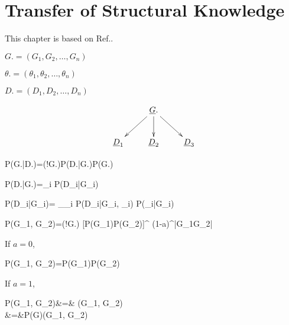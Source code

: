 \chapter{Transfer of Structural Knowledge}
\label{ch-transfer-struc}

This chapter is based on Ref.\cite{nic-transfer}.

$G. = (G_1, G_2, \ldots, G_n)$

$\theta. = (\theta_1, \theta_2, \ldots, \theta_n)$

$D. = (D_1, D_2, \ldots, D_n)$

\begin{figure}
$$\xymatrix
{
&\rvG.\ar[dl]\ar[d]\ar[dr]
\\
\rvD_1
&\rvD_2
&\rvD_3
}$$
\caption{}
\label{}
\end{figure}

\beq
P(G.|D.)=\caln(!G.)P(D.|G.)P(G.)
\eeq

\beq
P(D.|G.)=\prod_i P(D_i|G_i)
\eeq

\beq
P(D_i|G_i)=
\sum_{\theta_i}
P(D_i|G_i, \theta_i)
P(\theta_i|G_i)
\eeq

\beq
P(G_1, G_2)=\caln(!G.)
[P(G_1)P(G_2)]^{}
(1-a)^{|G_1\Delta G_2|}
\eeq


If $a=0$, 

\beq
P(G_1, G_2)=P(G_1)P(G_2)
\eeq

If $a=1$,

\beqa
P(G_1, G_2)&=&
\;\delta(G_1, G_2)
\\
&=&P(G)\;\delta(G_1, G_2)
\eeqa